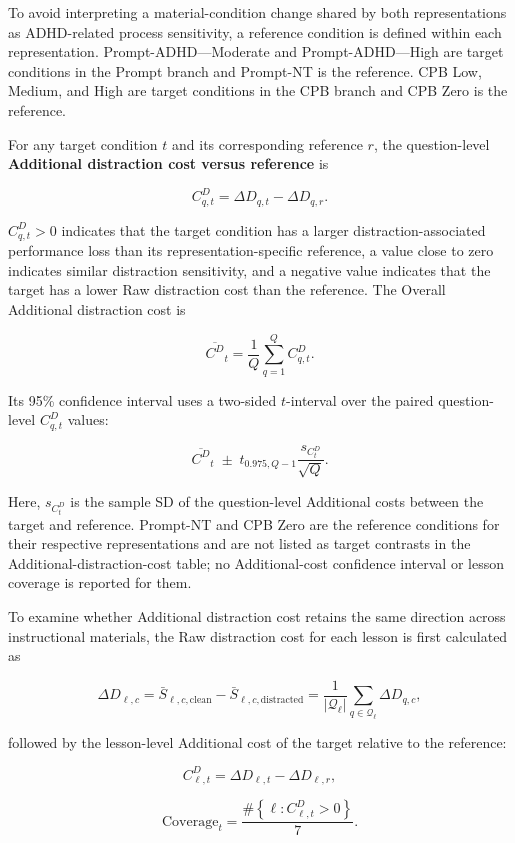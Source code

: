 To avoid interpreting a material-condition change shared by both representations as ADHD-related process sensitivity, a reference condition is defined within each representation. Prompt-ADHD---Moderate and Prompt-ADHD---High are target conditions in the Prompt branch and Prompt-NT is the reference. CPB Low, Medium, and High are target conditions in the CPB branch and CPB Zero is the reference.

For any target condition $t$ and its corresponding reference $r$, the question-level \textbf{Additional distraction cost versus reference} is

\[
C^D_{q,t}
=
\Delta D_{q,t}
-
\Delta D_{q,r}.
\]

$C^D_{q,t}>0$ indicates that the target condition has a larger distraction-associated performance loss than its representation-specific reference, a value close to zero indicates similar distraction sensitivity, and a negative value indicates that the target has a lower Raw distraction cost than the reference. The Overall Additional distraction cost is

\[
\overline{C^D}_{t}
=
\frac{1}{Q}
\sum_{q=1}^{Q}
C^D_{q,t}.
\]

Its 95\% confidence interval uses a two-sided $t$-interval over the paired question-level $C^D_{q,t}$ values:

\[
\overline{C^D}_{t}
\;\pm\;
t_{0.975,Q-1}
\frac{s_{C^D_t}}{\sqrt{Q}}.
\]

Here, $s_{C^D_t}$ is the sample SD of the question-level Additional costs between the target and reference. Prompt-NT and CPB Zero are the reference conditions for their respective representations and are not listed as target contrasts in the Additional-distraction-cost table; no Additional-cost confidence interval or lesson coverage is reported for them.

To examine whether Additional distraction cost retains the same direction across instructional materials, the Raw distraction cost for each lesson is first calculated as

\[
\Delta D_{\ell,c}
=
\bar S_{\ell,c,\mathrm{clean}}
-
\bar S_{\ell,c,\mathrm{distracted}}
=
\frac{1}{|\mathcal Q_\ell|}
\sum_{q\in\mathcal Q_\ell}
\Delta D_{q,c},
\]

followed by the lesson-level Additional cost of the target relative to the reference:

\[
C^D_{\ell,t}
=
\Delta D_{\ell,t}
-
\Delta D_{\ell,r},
\]

\[
\mathrm{Coverage}_{t}
=
\frac{
\#\left\{\ell:C^D_{\ell,t}>0\right\}
}{7}.
\]

